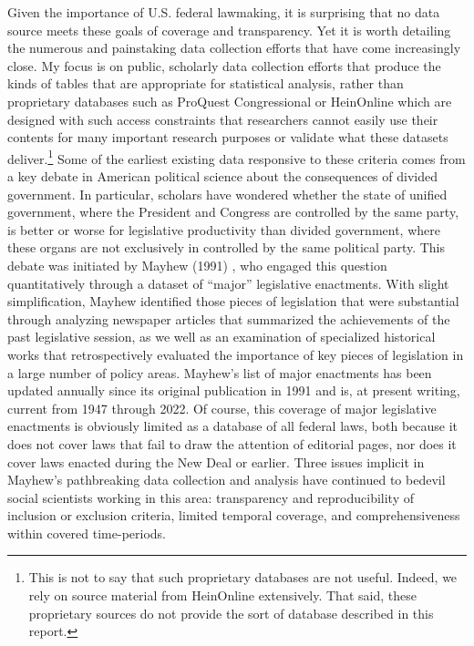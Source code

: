\documentclass[fleqn,10pt]{wlscirep}
\begin{document}
 Given the importance of U.S. federal lawmaking, it is surprising that no data source meets these goals of coverage and transparency. Yet it is worth detailing the numerous and painstaking data collection efforts that have come increasingly close. My focus is on public, scholarly data collection efforts that produce the kinds of tables that are appropriate for statistical analysis, rather than proprietary databases such as ProQuest Congressional or HeinOnline which are designed with such access constraints that researchers cannot easily use their contents for many important research purposes or validate what these datasets deliver.\footnote{This is not to say that such proprietary databases are not useful. Indeed, we rely on source material from HeinOnline extensively. That said, these proprietary sources do not provide the sort of database described in this report.} Some of the earliest existing data responsive to these criteria comes from a key debate in American political science about the consequences of divided government. In particular, scholars have wondered whether the state of unified government, where the President and Congress are controlled by the same party, is better or worse for legislative productivity than divided government, where these organs are not exclusively in controlled by the same political party. This debate was initiated by Mayhew (1991) \nocite{Mayhew1991}, who engaged this question quantitatively through a dataset of ``major'' legislative enactments. With slight simplification, Mayhew identified those pieces of legislation that were substantial through analyzing newspaper articles that summarized the achievements of the past legislative session, as we well as an examination of specialized historical works that retrospectively evaluated the importance of key pieces of legislation in a large number of policy areas. Mayhew's list of major enactments has been updated annually since its original publication in 1991 and is, at present writing, current from 1947 through 2022. Of course, this coverage of major legislative enactments is obviously limited as a database of all federal laws, both because it does not cover laws that fail to draw the attention of editorial pages, nor does it cover laws enacted during the New Deal or earlier.  Three issues implicit in Mayhew's pathbreaking data collection and analysis have continued to bedevil social scientists working in this area: transparency and reproducibility of inclusion or exclusion criteria, limited temporal coverage, and comprehensiveness within covered time-periods.
\end{document}
